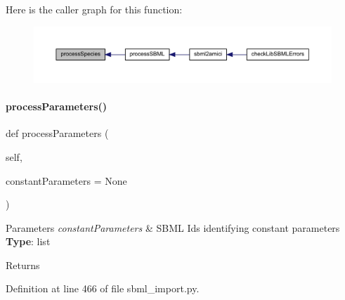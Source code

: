 Here is the caller graph for this function\+:
\nopagebreak
\begin{figure}[H]
\begin{center}
\leavevmode
\includegraphics[width=350pt]{classamici_1_1sbml__import_1_1_sbml_importer_a4912a89bf86ec8e0c1d9758b8090e327_icgraph}
\end{center}
\end{figure}
\mbox{\label{classamici_1_1sbml__import_1_1_sbml_importer_a26d072114efe1fec695cc4030c64e1ea}} 
\paragraph{\texorpdfstring{process\+Parameters()}{processParameters()}}
{\footnotesize\ttfamily def process\+Parameters (\begin{DoxyParamCaption}\item[{}]{self,  }\item[{}]{constant\+Parameters = {\ttfamily None} }\end{DoxyParamCaption})}


\begin{DoxyParams}{Parameters}
{\em constant\+Parameters} & S\+B\+ML Ids identifying constant parameters ~\newline
{\bfseries Type}\+: list\\
\hline
\end{DoxyParams}
\begin{DoxyReturn}{Returns}

\end{DoxyReturn}


Definition at line 466 of file sbml\+\_\+import.\+py.

